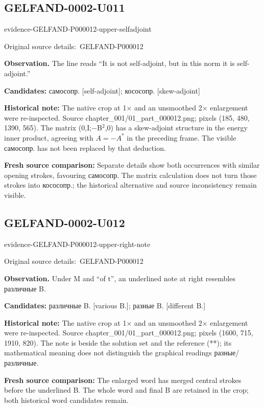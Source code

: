 \documentclass[11pt]{article}
\newcommand{\EvidenceBlock}[4]{%
 \par\smallskip\noindent\begin{minipage}{\linewidth}
 \begin{minipage}[t]{.47\linewidth}\vspace{0pt}\centering
 \csname evidence-#1-#2\endcsname\par
 {\scriptsize\SourceCropCaption\ #1}\par
 \end{minipage}\hfill
 \begin{minipage}[t]{.49\linewidth}\vspace{0pt}\raggedright
 {\small\color{orange!65!black}\textbf{#4} #3}\par
 \end{minipage}
 \end{minipage}\par\smallskip}
\newcommand{\SourceCropCaption}{Original source details:}\newcommand{\ReadingCaption}{Uncertain reading.}\newcommand{\IncompleteCaption}{Undeciphered passage.}\newcommand{\DiagramCaption}{Diagram and typed description.}
\begin{document}
\subsection*{GELFAND-0002-U011}
\EvidenceBlock{GELFAND-P000012}{upper-selfadjoint}{The line reads “It is not self-adjoint, but in this norm it is self-adjoint.”}{Observation.}
\par\smallskip\noindent\textbf{Candidates: } самосопр. [self-adjoint]; кососопр. [skew-adjoint]\par
\par\smallskip\noindent\textbf{Historical note: } The native crop at 1× and an unsmoothed 2× enlargement were re-inspected. Source chapter\_001/01\_part\_000012.png; pixels (185, 480, 1390, 565). The matrix (0,I;−B\(^2\),0) has a skew-adjoint structure in the energy inner product, agreeing with \(A=-A^*\) in the preceding frame. The visible самосопр. has not been replaced by that deduction.\par
\par\smallskip\noindent\textbf{Fresh source comparison: } Separate details show both occurrences with similar opening strokes, favouring самосопр. The matrix calculation does not turn those strokes into кососопр.; the historical alternative and source inconsistency remain visible.\par

\subsection*{GELFAND-0002-U012}
\EvidenceBlock{GELFAND-P000012}{upper-right-note}{Under M and “of t”, an underlined note at right resembles различные B.}{Observation.}
\par\smallskip\noindent\textbf{Candidates: } различные B. [various B.]; разные B. [different B.]\par
\par\smallskip\noindent\textbf{Historical note: } The native crop at 1× and an unsmoothed 2× enlargement were re-inspected. Source chapter\_001/01\_part\_000012.png; pixels (1600, 715, 1910, 820). The note is beside the solution set and the reference (**); its mathematical meaning does not distinguish the graphical readings разные/различные.\par
\par\smallskip\noindent\textbf{Fresh source comparison: } The enlarged word has merged central strokes before the underlined B. The whole word and final B are retained in the crop; both historical word candidates remain.\par
\end{document}
